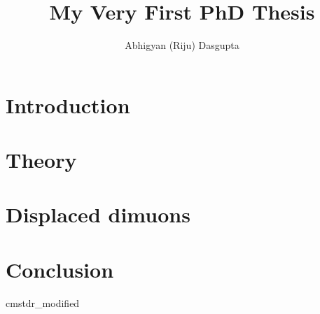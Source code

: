 \documentclass [PhD] {uclathes}
\title          {My Very First PhD Thesis}
\author         {Abhigyan (Riju) Dasgupta}
\begin{document}
\makeintropages


\chapter{Introduction}

\chapter{Theory}



\chapter{Displaced dimuons}



\chapter{Conclusion}



 {cmstdr_modified}
\end{document}
